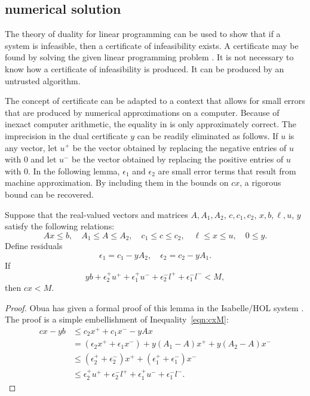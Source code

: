 \subsection{numerical solution}


The theory of duality for linear programming can be used to show that if a
system is infeasible, then a certificate of infeasibility exists.  A certificate
may be found by solving the given linear programming problem .
It is not necessary to know how a
certificate of infeasibility is produced.  It can be produced 
by an untrusted algorithm.  

The concept of certificate can be adapted to a context that allows for
small errors that are produced by numerical approximations on a
computer.  Because of inexact computer arithmetic, the equality in
 is only approximately correct. The imprecision in the dual
certificate $y$ can be readily eliminated as follows. If $u$ is any
vector, let $u^+$ be the vector obtained by replacing the negative
entries of $u$ with $0$ and let $u^-$ be the vector obtained by
replacing the positive entries of $u$ with $0$.  In the following
lemma, $\epsilon_1$ and $\epsilon_2$ are small error terms that result
from machine approximation. By including them in the bounds on $c x$,
a rigorous bound can be recovered.


\begin{lemma}  Suppose that the real-valued vectors and matrices
$A,A_1,A_2$, $c,c_1,c_2$, $x,b,\ell,u$, $y$ satisfy the following
relations:
  \[ 
  A x\le b, \quad A_1 \le A \le A_2,
  \quad c_1 \le c \le c_2,\quad \ell\le x\le u,\quad
  0\le y.
  \]
Define residuals
  \[ 
   \epsilon_1 = c_1 - y A_2,\quad \epsilon_2 = c_2  - y A_1.
  \]
If
\[ 
y b + \epsilon_2^+ u^+ + \epsilon_1^+ u^- + \epsilon_2^- l^+ + \epsilon_1^- l^- < M,
\]
then $c x < M$.
\end{lemma}

\begin{proof} Obua has given a formal proof of this lemma in the
Isabelle/HOL system \cite[3.7.2]{Obua:2008:Thesis}.  The proof
is a simple embellishment of Inequality~\ref{eqn:cxM}:
\begin{align*}
c x -y b &\le c_2 x^+ + c_1 x^- -y A x\\
              &= (\epsilon_2 x^+ + \epsilon_1 x^-)
  + y (A_1-A) x^+ + y (A_2 - A) x^- \\
              &\le (\epsilon_2^+ +\epsilon_2^-) x^+ 
       + (\epsilon_1^++\epsilon_1^-) x^-\\
              &\le \epsilon_2^+ u^+ +  \epsilon_2^- l^+ 
           + \epsilon_1^+ u^- + \epsilon_1^- l^-.
\end{align*}
\end{proof}

